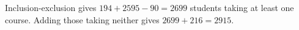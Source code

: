 Inclusion-exclusion gives $194+2595-90=2699$ students taking at least one course. Adding those taking neither gives $2699+216=\boxed{2915}$.
